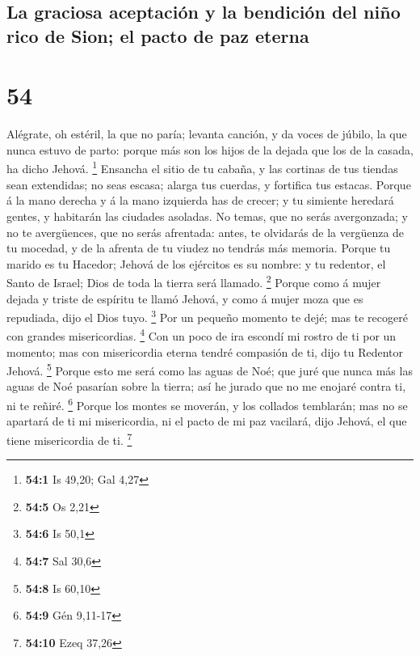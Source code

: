 \hypertarget{la-graciosa-aceptaciuxf3n-y-la-bendiciuxf3n-del-niuxf1o-rico-de-sion-el-pacto-de-paz-eterna}{%
\subsection{La graciosa aceptación y la bendición del niño rico de Sion;
el pacto de paz
eterna}\label{la-graciosa-aceptaciuxf3n-y-la-bendiciuxf3n-del-niuxf1o-rico-de-sion-el-pacto-de-paz-eterna}}

\hypertarget{section-53}{%
\section{54}\label{section-53}}

 Alégrate, oh estéril, la que no paría; levanta canción, y
da voces de júbilo, la que nunca estuvo de parto: porque más son los
hijos de la dejada que los de la casada, ha dicho Jehová. \footnote{\textbf{54:1}
  Is 49,20; Gal 4,27}  Ensancha el sitio de tu cabaña, y las
cortinas de tus tiendas sean extendidas; no seas escasa; alarga tus
cuerdas, y fortifica tus estacas.  Porque á la mano derecha
y á la mano izquierda has de crecer; y tu simiente heredará gentes, y
habitarán las ciudades asoladas.  No temas, que no serás
avergonzada; y no te avergüences, que no serás afrentada: antes, te
olvidarás de la vergüenza de tu mocedad, y de la afrenta de tu viudez no
tendrás más memoria.  Porque tu marido es tu Hacedor; Jehová
de los ejércitos es su nombre: y tu redentor, el Santo de Israel; Dios
de toda la tierra será llamado. \footnote{\textbf{54:5} Os 2,21}
 Porque como á mujer dejada y triste de espíritu te llamó
Jehová, y como á mujer moza que es repudiada, dijo el Dios tuyo.
\footnote{\textbf{54:6} Is 50,1}  Por un pequeño momento te
dejé; mas te recogeré con grandes misericordias. \footnote{\textbf{54:7}
  Sal 30,6}  Con un poco de ira escondí mi rostro de ti por
un momento; mas con misericordia eterna tendré compasión de ti, dijo tu
Redentor Jehová. \footnote{\textbf{54:8} Is 60,10}  Porque
esto me será como las aguas de Noé; que juré que nunca más las aguas de
Noé pasarían sobre la tierra; así he jurado que no me enojaré contra ti,
ni te reñiré. \footnote{\textbf{54:9} Gén 9,11-17}  Porque
los montes se moverán, y los collados temblarán; mas no se apartará de
ti mi misericordia, ni el pacto de mi paz vacilará, dijo Jehová, el que
tiene misericordia de ti. \footnote{\textbf{54:10} Ezeq 37,26}

